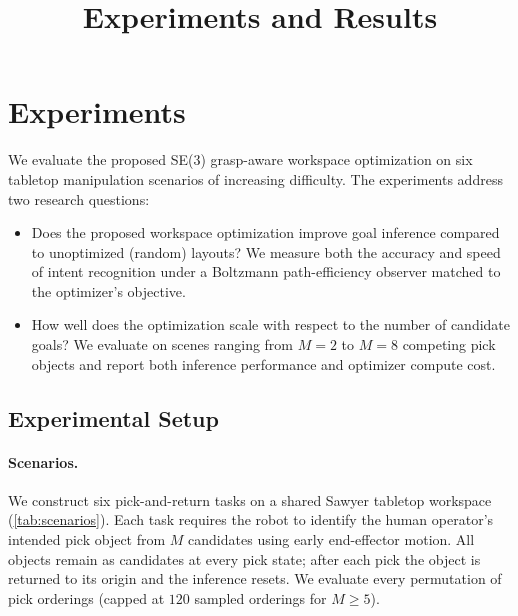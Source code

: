 \documentclass[letterpaper, 10pt, conference]{ieeeconf}
\title{\LARGE \bf Experiments and Results}
\begin{document}
\maketitle
\thispagestyle{empty}
\pagestyle{empty}


\section{Experiments}
\label{sec:experiments}

We evaluate the proposed SE(3) grasp-aware workspace optimization
on six tabletop manipulation scenarios of increasing difficulty.
The experiments address two research questions:

\begin{itemize}
  \item[\textbf{RQ1}] Does the proposed workspace optimization
    improve goal inference compared to unoptimized (random) layouts?
    We measure both the accuracy and speed of intent recognition
    under a Boltzmann path-efficiency observer matched to the
    optimizer's objective.
  \item[\textbf{RQ2}] How well does the optimization scale with
    respect to the number of candidate goals?  We evaluate on
    scenes ranging from $M{=}2$ to $M{=}8$ competing pick objects
    and report both inference performance and optimizer compute cost.
\end{itemize}

\subsection{Experimental Setup}
\label{sec:setup}

\paragraph{Scenarios.}
We construct six pick-and-return tasks on a shared Sawyer
tabletop workspace (\cref{tab:scenarios}).  Each task requires the
robot to identify the human operator's intended pick object from
$M$ candidates using early end-effector motion.  All objects remain
as candidates at every pick state; after each pick the object is
returned to its origin and the inference resets.  We evaluate every
permutation of pick orderings (capped at $120$ sampled orderings
for $M \ge 5$).
\end{document}
